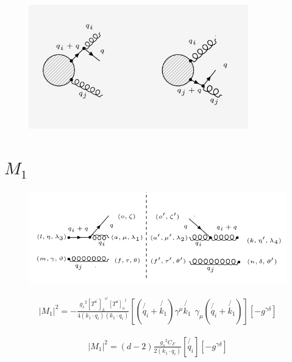 
\begin{figure}[ht!]
\centering
\includegraphics[width=0.85\textwidth]{images/GQ/GQDiagrams.png}
\end{figure}

\pagebreak

\section{$ M_1 $}
\begin{figure}[ht!]
\centering
\includegraphics[scale=0.7]{images/GQ/M1Squer.png}
\end{figure}

\begin{equation}
\begin{split}
|M_1|^2=-\frac{{g_s}^2 {[T^{a^{\prime}}]_k}^{o^{\prime}} {[T^a]_{o}}^{l}}{4(k_1 \cdot q_i)(k_1 \cdot q_i)}[(\not{q_i}+\not{k_1}){\gamma}^{\mu}\not{k_1}\:\: {\gamma}_{{\mu}}(\not{q_i}+\not{k_1})][-g^{{\gamma}{\delta}}]
\end{split}
\end{equation}

\begin{equation}
\begin{split}
|M_1|^2=(d-2)\frac{{g_s}^2 C_F}{2(k_1 \cdot q_i)}[\not{q_i}][-g^{{\gamma}{\delta}}]
\end{split}
\end{equation}

